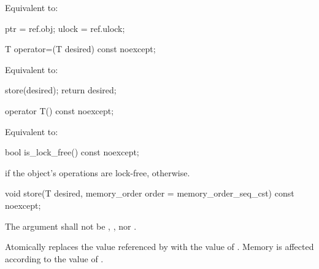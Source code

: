 \begin{itemdescr}
\pnum
\effects {}
\begin{addedblock}Equivalent to:
\begin{codeblock}
  ptr = ref.obj;
  ulock = ref.ulock;
\end{codeblock}
\end{addedblock}

\end{itemdescr}

\begin{itemdecl}
T operator=(T desired) const noexcept;
\end{itemdecl}

\begin{itemdescr}
\pnum
\effects Equivalent to:
\begin{codeblock}
  store(desired);
  return desired;
\end{codeblock}
\end{itemdescr}

\begin{itemdecl}
operator T() const noexcept;
\end{itemdecl}

\begin{itemdescr}
\pnum
\effects Equivalent to: 
\end{itemdescr}

\begin{itemdecl}
bool is_lock_free() const noexcept;
\end{itemdecl}

\begin{itemdescr}
\pnum
\returns {} if the object's operations are lock-free,
 otherwise.
\end{itemdescr}

\begin{itemdecl}
void store(T desired, memory_order order = memory_order_seq_cst) const noexcept;
\end{itemdecl}

\begin{itemdescr}
\pnum
\removed{\requires}\added{\expects} The  argument shall not be
,
, nor
.

\pnum
\effects Atomically replaces the value referenced by 
with the value of .
Memory is affected according to the value of .
\end{itemdescr}


